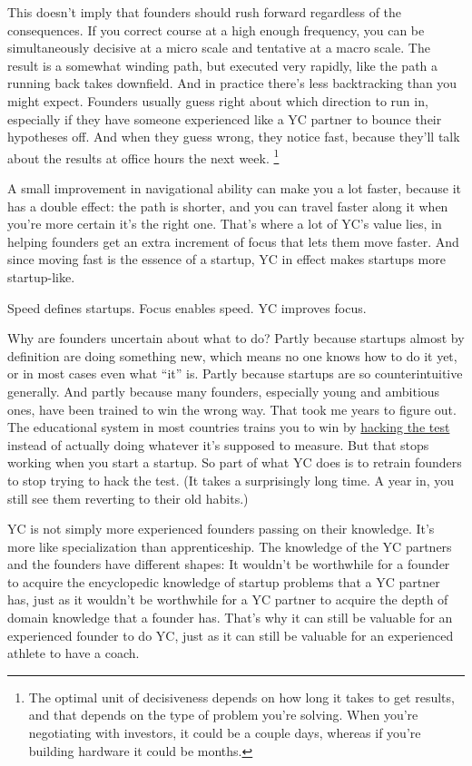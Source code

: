 \documentclass[12pt]{book}
\begin{document}
This doesn't imply that founders should rush forward regardless of the
consequences. If you correct course at a high enough frequency, you can
be simultaneously decisive at a micro scale and tentative at a macro
scale. The result is a somewhat winding path, but executed very rapidly,
like the path a running back takes downfield. And in practice there's
less backtracking than you might expect. Founders usually guess right
about which direction to run in, especially if they have someone
experienced like a YC partner to bounce their hypotheses off. And when
they guess wrong, they notice fast, because they'll talk about the
results at office hours the next week. \footnote{The optimal unit of decisiveness depends on how long it takes to
get results, and that depends on the type of problem you're solving.
When you're negotiating with investors, it could be a couple days,
whereas if you're building hardware it could be months.}

A small improvement in navigational ability can make you a lot faster,
because it has a double effect: the path is shorter, and you can travel
faster along it when you're more certain it's the right one. That's
where a lot of YC's value lies, in helping founders get an extra
increment of focus that lets them move faster. And since moving fast is
the essence of a startup, YC in effect makes startups more startup-like.

Speed defines startups. Focus enables speed. YC improves focus.

Why are founders uncertain about what to do? Partly because startups
almost by definition are doing something new, which means no one knows
how to do it yet, or in most cases even what ``it'' is. Partly because
startups are so counterintuitive generally. And partly because many
founders, especially young and ambitious ones, have been trained to win
the wrong way. That took me years to figure out. The educational system
in most countries trains you to win by \href{lesson.html}{hacking the
test} instead of actually doing whatever it's supposed to measure. But
that stops working when you start a startup. So part of what YC does is
to retrain founders to stop trying to hack the test. (It takes a
surprisingly long time. A year in, you still see them reverting to their
old habits.)

YC is not simply more experienced founders passing on their knowledge.
It's more like specialization than apprenticeship. The knowledge of the
YC partners and the founders have different shapes: It wouldn't be
worthwhile for a founder to acquire the encyclopedic knowledge of
startup problems that a YC partner has, just as it wouldn't be
worthwhile for a YC partner to acquire the depth of domain knowledge
that a founder has. That's why it can still be valuable for an
experienced founder to do YC, just as it can still be valuable for an
experienced athlete to have a coach.
\end{document}
